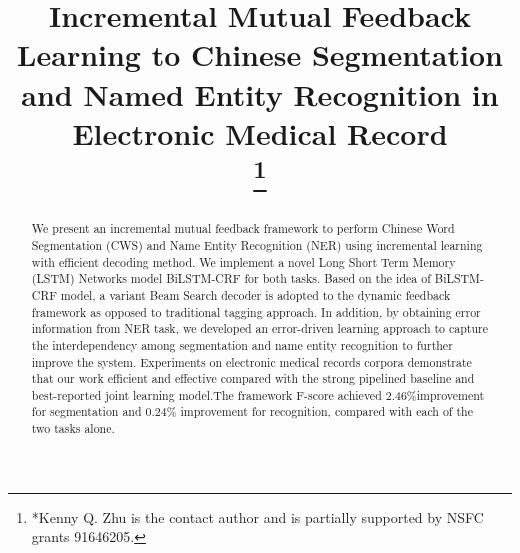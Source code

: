 \documentclass[conference]{IEEEtran}
\begin{document}
\title{Incremental Mutual Feedback Learning to Chinese Segmentation and Named Entity Recognition in Electronic Medical Record\\
\thanks{*Kenny Q. Zhu is the contact author and is partially supported by NSFC grants  91646205.}
}

\author{
\and
{}
\and
{}
\and
{}
}

\maketitle

\begin{abstract}
We present an incremental mutual feedback framework to perform Chinese Word Segmentation (CWS)  and Name Entity Recognition (NER) using incremental learning with efficient decoding method. We implement a novel Long Short Term Memory (LSTM) Networks model  BiLSTM-CRF for both tasks. Based on the idea of BiLSTM-CRF model, a variant Beam Search decoder is adopted to the dynamic feedback framework as opposed to traditional tagging approach. In addition, by obtaining error information from NER task, we developed an error-driven learning approach to capture the interdependency among segmentation and name entity recognition to further improve the system. Experiments on electronic medical records corpora demonstrate that our work efficient and effective compared with the strong pipelined baseline and best-reported joint learning model.The framework  F-score achieved 2.46\%improvement for segmentation and 0.24\% improvement for recognition, compared with each of the two tasks alone.
\end{abstract}
\end{document}

